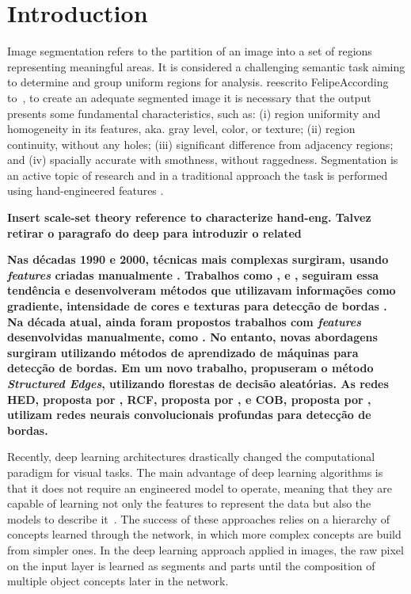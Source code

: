 \section{Introduction}
\label{sec:intro}

Image segmentation refers to the partition of an image into a set of regions representing  meaningful areas. It is considered a challenging semantic task aiming to determine and group uniform regions for analysis. {\color{green}reescrito Felipe}According to~\cite{DOMINGUEZ}, to create an adequate segmented image it is necessary that the output presents some fundamental characteristics, such as: (i) region uniformity and homogeneity in  its features, aka. gray level, color, or texture; (ii) region continuity, without any holes; (iii) significant difference from adjacency regions; and (iv) spacially accurate with smothness, without raggedness. Segmentation is an active topic of research and in a traditional approach the task is performed using hand-engineered features \cite{Segnet:2017:7803544}.  

\textbf{Insert scale-set theory reference to characterize hand-eng. Talvez retirar o paragrafo do deep para introduzir o related}

\textbf{
Nas décadas 1990 e 2000, técnicas mais complexas surgiram, usando \textit{features} criadas manualmente \cite{RCF:8100105}. Trabalhos como ,  e , seguiram essa tendência e desenvolveram métodos que utilizavam informações como gradiente, intensidade de cores e texturas para detecção de bordas \cite{RCF:8100105}.
}
\textbf{
Na década atual, ainda foram propostos trabalhos com \textit{features} desenvolvidas manualmente, como . No entanto, novas abordagens surgiram utilizando métodos de aprendizado de máquinas para detecção de bordas. Em um novo trabalho,  propuseram o método \textit{Structured Edges}, utilizando florestas de decisão aleatórias. As redes HED, proposta por , RCF, proposta por , e COB, proposta por , utilizam redes neurais convolucionais profundas para detecção de bordas.
}

Recently, deep learning architectures drastically changed the computational paradigm for visual tasks. The main advantage of deep learning algorithms is that it does not require an engineered model to operate, meaning that they are capable of learning not only the features to represent the data but also the models to describe it~\cite{goodfellow16}. The success of these approaches relies on a hierarchy of concepts learned through the network, in which more complex concepts are build from simpler ones. In the deep learning approach applied in images, the raw pixel on the input layer is learned as segments and parts until the composition of multiple object concepts later in the network.

